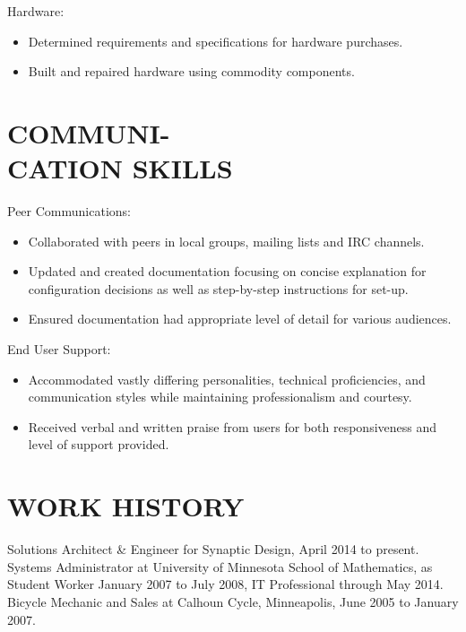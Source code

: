 \documentclass[line,margin]{res}
\begin{document}
\begin{resume}
    Hardware:
    \vspace{1 mm}
    \begin{itemize} \itemsep -1.5pt %
        \item Determined requirements and specifications for hardware purchases.
        \item Built and repaired hardware using commodity components.
    \end{itemize}


\section{COMMUNI- \\ CATION SKILLS}

    Peer Communications:
    \vspace{1 mm}
    \begin{itemize} \itemsep -1.5pt %
        \item Collaborated with peers in local groups, mailing lists and
        IRC channels.
        \item Updated and created documentation focusing on concise
        explanation for configuration decisions as well as step-by-step
        instructions for set-up.
        \item Ensured documentation had appropriate level of detail for
        various audiences.
    \end{itemize}
    \vspace{-3 mm}

    End User Support:
    \vspace{1 mm}
    \begin{itemize} \itemsep -1.5pt %
        \item Accommodated vastly differing personalities, technical
        proficiencies, and communication styles while maintaining
        professionalism and courtesy.
        \item Received verbal and written praise from users for both
        responsiveness and level of support provided.
    \end{itemize}


\section{WORK HISTORY}
    Solutions Architect \& Engineer for Synaptic Design, April 2014 to present.
    \vspace{1 mm} \\
    Systems Administrator at University of Minnesota School of
    Mathematics, as Student Worker January 2007 to July 2008, IT Professional
    through May 2014.
    \vspace{1 mm} \\
    Bicycle Mechanic and Sales at Calhoun Cycle, Minneapolis, June 2005 to
    January 2007.


\end{resume}
\end{document}
